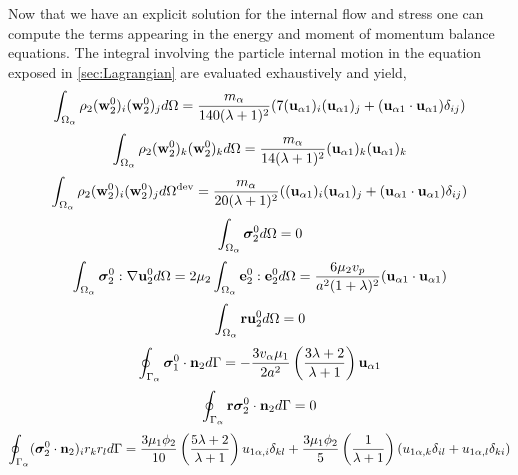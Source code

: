 Now that we have an explicit solution for the internal flow and stress one can compute the terms appearing in the energy and moment of momentum balance equations. 
The integral involving the particle internal motion in the equation exposed in \ref{sec:Lagrangian} are evaluated exhaustively and yield, 
\begin{equation*}
    \int_{\Omega_\alpha} \rho_2(\textbf{w}_2^0)_i (\textbf{w}_2^0)_j d\Omega
    = \frac{m_\alpha}{140 (\lambda +1)^2}
    (7 (\textbf{u}_{\alpha 1})_i(\textbf{u}_{\alpha 1})_j + (\textbf{u}_{\alpha 1}\cdot \textbf{u}_{\alpha 1})\delta_{ij})
\end{equation*} 
\begin{equation*}
    \int_{\Omega_\alpha} \rho_2(\textbf{w}_2^0)_k (\textbf{w}_2^0)_k d\Omega
    = \frac{m_\alpha}{14 (\lambda +1)^2}
     (\textbf{u}_{\alpha 1})_k(\textbf{u}_{\alpha 1})_k
\end{equation*} 
\begin{equation*}
    \int_{\Omega_\alpha} \rho_2(\textbf{w}_2^0)_i (\textbf{w}_2^0)_j d\Omega^\text{dev}
    = \frac{m_\alpha}{20 (\lambda +1)^2}
    ((\textbf{u}_{\alpha 1})_i(\textbf{u}_{\alpha 1})_j + (\textbf{u}_{\alpha 1}\cdot \textbf{u}_{\alpha 1})\delta_{ij})
\end{equation*} 
\begin{equation*}
    \int_{\Omega_\alpha} \bm\sigma_2^0 d\Omega
    = 0 
\end{equation*}
\begin{equation*}
    \int_{\Omega_\alpha} \bm{\sigma}_2^0:\mathbf{\nabla} \textbf{u}_2^0 d\Omega
    = 2\mu_2 \int_{\Omega_\alpha} \textbf{e}_2^0: \textbf{e}_2^0  d\Omega
    = 
    \frac{6 \mu_2 v_p}{a^2(1+\lambda)^2}
    (\textbf{u}_{\alpha 1}\cdot \textbf{u}_{\alpha 1})
\end{equation*}
\begin{align*}
    \int_{\Omega_\alpha} \textbf{r}\textbf{u}_2^0 d\Omega
    = 0 
\end{align*}
\begin{equation*}
    \oint_{\Gamma_\alpha} \bm\sigma_1^0\cdot \textbf{n}_2 d\Gamma
    = - \frac{3v_\alpha\mu_1}{2 a^2} 
    \left(\frac{3\lambda+2}{\lambda+1}\right) 
    \textbf{u}_{\alpha 1}
\end{equation*}
\begin{equation*}
    \oint_{\Gamma_\alpha} \textbf{r}\bm\sigma_2^0\cdot \textbf{n}_2 d\Gamma
    = 0 
\end{equation*}
\begin{equation*}
    \oint_{\Gamma_\alpha} (\bm\sigma_2^0\cdot \textbf{n}_2)_i r_kr_l d\Gamma
    = \frac{3\mu_1\phi_2}{10}\left(\frac{5\lambda+2}{\lambda+1}\right)u_{1 \alpha,i}\delta_{kl}
    + \frac{3\mu_1\phi_2}{5}\left(\frac{1}{\lambda+1}\right)(u_{1 \alpha,k}\delta_{il}+u_{1 \alpha,l}\delta_{ki})
\end{equation*}
